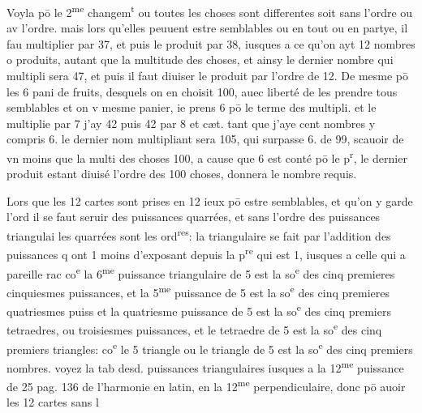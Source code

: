 \documentclass[11pt,a4paper]{article}
\begin{document}
Voyla pō le 2\textsuperscript{me} changem\textsuperscript{t} ou toutes les choses sont differentes soit sans l'ordre ou av l'ordre. mais lors qu'elles peuuent estre semblables ou en tout ou en partye, il fau multiplier  par 37, et puis le produit par 38, iusques a ce qu'on ayt 12 nombres o produits, autant que la multitude des choses, et ainsy le dernier nombre qui multipli\ill{} sera 47, et puis il faut diuiser le produit par l'ordre de 12. De mesme pō les 6 pani de fruits, desquels on en choisit 100, auec liberté de les prendre tous semblables et on v\ill{} mesme panier, ie prens 6 pō le terme des multipli. et le multiplie par 7 j'ay 42 puis 42 par 8 et cæt. tant que j'aye cent nombres y compris 6. le dernier nom multipliant sera 105, qui surpasse 6. de 99, scauoir de vn moins que la multi des choses 100, a cause que 6 est conté pō le p\textsuperscript{r}, le dernier produit estant diuisé \ill{} l'ordre des 100 choses, donnera le nombre requis.

Lors que les 12 cartes sont prises en 12 ieux pō estre semblables, et qu'on y garde l'ord il se faut seruir des puissances quarrées, et sans l'ordre des puissances triangulai les quarrées sont les ord\textsuperscript{res}: la triangulaire se fait par l'addition des puissances q\ill{} ont 1 moins d'exposant depuis la p\textsuperscript{re} qui est 1, iusques a celle qui a pareille rac co\textsuperscript{e} la 6\textsuperscript{me} puissance triangulaire de 5 est la so\textsuperscript{e} des cinq premieres cinquiesmes puissances, et la 5\textsuperscript{me} puissance de 5 est la so\textsuperscript{e} des cinq premieres quatriesmes puiss et la quatriesme puissance de 5 est la so\textsuperscript{e} des cinq premiers tetraedres, ou troisiesmes puissances, et le tetraedre de 5 est la so\textsuperscript{e} des cinq premiers triangles: co\textsuperscript{e} le 5 triangle ou le triangle de 5 est la so\textsuperscript{e} des cinq premiers nombres. voyez la tab desd. puissances triangulaires iusques a la 12\textsuperscript{me} puissance de 25 pag. 136 de l'harmonie en latin, en la 12\textsuperscript{me} perpendiculaire, donc pō auoir les 12 cartes sans l\ill{}
\end{document}
